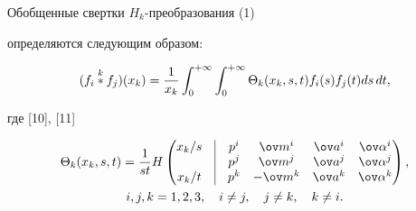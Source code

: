 \begin{defn} 


Обобщенные свертки $H_k$-преобразования (1) 


определяются следующим образом: 


\begin{equation} 


(f_i\up{k}{*}f_j)(x_k)=\frac{1}{x_k} 


\int^{+\infty}_0\int^{+\infty}_0 


\Theta_k(x_k,s,t)f_i(s)f_j(t)ds\,dt, 


\end{equation} 


где [10], [11] 


\begin{gather*} 


\Theta_k(x_k,s,t)=\frac{1}{s t}H 


\begin{pmatrix} 


x_k/s & \vline & p^i & \ov m^i & \ov a^i & \ov\alpha^i \\ 


\ & \vline & p^j & \ov m^j & \ov a^j & \ov\alpha^j \\ 


x_k/t & \vline & p^k & -\ov m^k & \ov a^k & \ov \alpha^k 


\end{pmatrix} 


, \\ 


% 


i,j,k=1,2,3,\quad i\ne j,\quad j\ne k,\quad k\ne i. 


\end{gather*} 


\end{defn}


 


